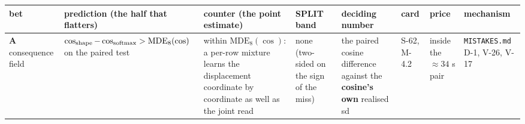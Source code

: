 \documentclass[11pt,a4paper]{article}
\newcounter{none}                 %
\theoremstyle{plain}
\theoremstyle{definition}
\theoremstyle{remark}
\begin{document}
{\def\LTcaptype{none} %
\begin{longtable}[]{@{}
  >{\raggedright\arraybackslash}p{}
  >{\raggedright\arraybackslash}p{}
  >{\raggedright\arraybackslash}p{}
  >{\raggedright\arraybackslash}p{}
  >{\raggedright\arraybackslash}p{}
  >{\raggedright\arraybackslash}p{}
  >{\raggedright\arraybackslash}p{}
  >{\raggedright\arraybackslash}p{}@{}}
\toprule\noalign{}
\begin{minipage}[b]{\linewidth}\raggedright
bet
\end{minipage} & \begin{minipage}[b]{\linewidth}\raggedright
prediction (the half that flatters)
\end{minipage} & \begin{minipage}[b]{\linewidth}\raggedright
counter (the point estimate)
\end{minipage} & \begin{minipage}[b]{\linewidth}\raggedright
SPLIT band
\end{minipage} & \begin{minipage}[b]{\linewidth}\raggedright
deciding number
\end{minipage} & \begin{minipage}[b]{\linewidth}\raggedright
card
\end{minipage} & \begin{minipage}[b]{\linewidth}\raggedright
price
\end{minipage} & \begin{minipage}[b]{\linewidth}\raggedright
mechanism
\end{minipage} \\
\midrule\noalign{}
\endhead
\bottomrule\noalign{}
\endlastfoot
\textbf{A} consequence field &
\(\cos_{\rm shape}-\cos_{\rm softmax}>\mathrm{MDE}_8(\cos)\) on the
paired test & within \(\mathrm{MDE}_8(\cos)\): a per-row mixture learns
the displacement coordinate by coordinate as well as the joint read &
none (two-sided on the sign of the miss) & the paired cosine difference
against the \textbf{cosine's own} realised sd & S-62, M-4.2 & inside the
\(\approx34\) s pair & \texttt{MISTAKES.md} D-1, V-26, V-17 \\

\end{longtable}}
\end{document}
